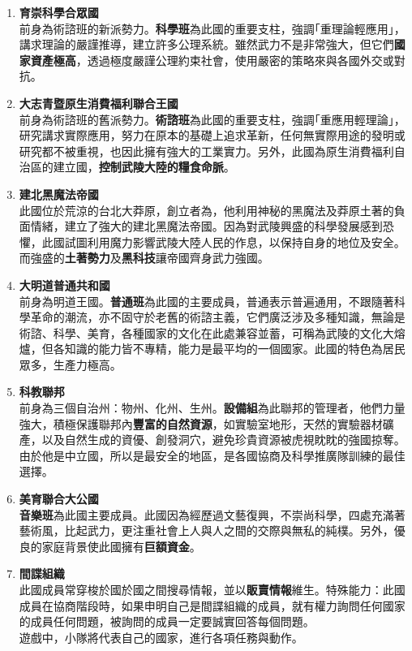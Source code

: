 \begin{enumerate}
    \item \textbf{育崇科學合眾國} \\
    前身為術諮班的新派勢力。\textbf{科學班}為此國的重要支柱，強調｢重理論輕應用｣，講求理論的嚴謹推導，建立許多公理系統。雖然武力不是非常強大，但它們\textbf{國家資產極高}，透過極度嚴謹公理約束社會，使用嚴密的策略來與各國外交或對抗。
    \item \textbf{大志青暨原生消費福利聯合王國} \\
    前身為術諮班的舊派勢力。\textbf{術諮班}為此國的重要支柱，強調｢重應用輕理論｣，研究講求實際應用，努力在原本的基礎上追求革新，任何無實際用途的發明或研究都不被重視，也因此擁有強大的工業實力。另外，此國為原生消費福利自治區的建立國，\textbf{控制武陵大陸的糧食命脈}。
    \item \textbf{建北黑魔法帝國} \\
    此國位於荒涼的台北大莽原，創立者為\underline{\hspace{2em}}，他利用神秘的黑魔法及莽原土著的負面情緒，建立了強大的建北黑魔法帝國。因為對武陵興盛的科學發展感到恐懼，此國試圖利用魔力影響武陵大陸人民的作息，以保持自身的地位及安全。而強盛的\textbf{土著勢力}及\textbf{黑科技}讓帝國齊身武力強國。
    \item \textbf{大明道普通共和國}\\
    前身為明道王國。\textbf{普通班}為此國的主要成員，普通表示普遍通用，不跟隨著科學革命的潮流，亦不固守於老舊的術諮主義，它們廣泛涉及多種知識，無論是術諮、科學、美育，各種國家的文化在此處兼容並蓄，可稱為武陵的文化大熔爐，但各知識的能力皆不專精，能力是最平均的一個國家。此國的特色為居民眾多，生產力極高。
    \item \textbf{科教聯邦}\\
    前身為三個自治州：物州、化州、生州。\textbf{設備組}為此聯邦的管理者，他們力量強大，積極保護聯邦內\textbf{豐富的自然資源}，如實驗室地形，天然的實驗器材礦產，以及自然生成的資優、創發洞穴，避免珍貴資源被虎視眈眈的強國掠奪。由於他是中立國，所以是最安全的地區，是各國協商及科學推廣隊訓練的最佳選擇。 
    \item \textbf{美育聯合大公國}\\
    \textbf{音樂班}為此國主要成員。此國因為經歷過文藝復興，不崇尚科學，四處充滿著藝術風，比起武力，更注重社會上人與人之間的交際與無私的純樸。另外，優良的家庭背景使此國擁有\textbf{巨額資金}。
    \item \textbf{間諜組織}\\
    此國成員常穿梭於國於國之間搜尋情報，並以\textbf{販賣情報}維生。特殊能力：此國成員在協商階段時，如果申明自己是間諜組織的成員，就有權力詢問任何國家的成員任何問題，被詢問的成員一定要誠實回答每個問題。\\
    遊戲中，小隊將代表自己的國家，進行各項任務與動作。
\end{enumerate}

